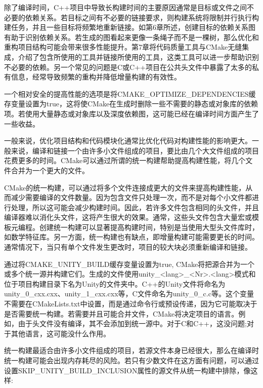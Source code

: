 
除了编译时间，C++项目中导致长构建时间的主要原因通常是目标或文件之间不必要的依赖关系。若目标之间有不必要的链接要求，则构建系统将限制并行执行构建任务，并且一些目标将频繁地重新链接。如第6章所述，创建目标的依赖关系图有助于识别依赖关系。若生成的图看起来更像一条绳子而不是一棵树，那么优化和重构项目结构可能会带来很多性能提升。第7章将代码质量工具与CMake无缝集成，介绍了包含所使用的工具并链接所使用的工具，这类工具可以进一步帮助识别不必要的依赖。另一个常见的问题是C或C++项目在公共头文件中暴露了太多的私有信息，经常导致频繁的重构并降低增量构建的有效性。

一个相对安全的提高性能的选项是将CMAKE\_OPTIMIZE\_DEPENDENCIES缓存变量设置为true，这将使CMake在生成时删除一些不需要的静态或对象库的依赖项。若使用大量静态或对象库以及深度依赖图，这可能已经在编译时间方面产生了一些收益。

一般来说，优化项目结构和代码模块化通常比优化代码对构建性能的影响更大。一般来说，编译和链接一个由许多小文件组成的项目，要比由几个大文件组成的项目花费更多的时间。CMake可以通过所谓的统一构建帮助提高构建性能，将几个文件合并为一个更大的文件。


CMake的统一构建，可以通过将多个文件连接成更大的文件来提高构建性能，从而减少需要编译的文件数量。因为包含文件只处理一次，而不是对每个小文件都进行处理，所以这可能会减少构建时间。因此，若许多文件包含相同的头文件，并且编译器难以消化头文件，这将产生很大的效果。通常，这些头文件包含大量宏或模板元编程。创建统一构建可以显著提高构建时间，特别是当使用大型头文件库时，如数学特征库。另一方面，统一构建也有缺点，即增量构建可能需要更长的时间。通常情况下，当只有单个文件发生更改时，项目的较大块必须重新编译和链接。

通过将CMAKE\_UNITY\_BUILD缓存变量设置为true, CMake将把源合并为一个或多个统一源并构建它们。生成的文件使用unity\_<lang>\_<Nr>.<lang>模式和位于项目构建目录下名为Unity的文件夹中。C++的Unity文件将命名为unity\_0\_cxx.cxx、unity\_1\_cxx.cxx等，C文件命名为unity\_0\_c.c等。这个变量不需要在CMakeLists.txt中设置，而是通过命令行或预设传递，因为它可能取决于是否需要统一构建。若需要并且可能合并文件，CMake将决定项目的语言。例如，由于头文件没有编译，其不会添加到统一源中。对于C和C++，这没问题;对于其他语言，这可能没什么作用。

统一构建最适合由许多小文件组成的项目，若源文件本身已经很大，那么在编译时统一构建可能会出现内存耗尽的风险。若只有少数文件在这方面有问题，可以通过设置SKIP\_UNITY\_BUILD\_INCLUSION属性的源文件从统一构建中排除，像这样:

